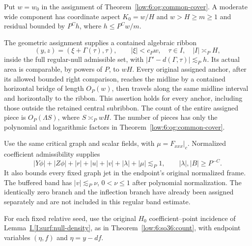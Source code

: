 \documentclass[11pt]{amsart}
\theoremstyle{definition}
\theoremstyle{remark}
\numberwithin{equation}{section}
\newcommand{\partIref}[1]{\hyperref[I:#1]{I.\ref*{I:#1}}}
\begin{document}
Put $w=w_0$ in the assignment of Theorem~\ref{low:6:og:common-cover}. A moderate wide component has coordinate aspect $K_0=w/H$ and $w>H\ge m\ge1$ and residual bounded by $P^Ch$, where $h\le P^Cw/m$. 

The geometric assignment supplies a contained algebraic ribbon
\begin{equation}\label{low:6:wc36:eq-ribbon}
 (y,z)=(\xi+\Gamma(\tau),\tau),\qquad |\xi|<c_Pw,\quad \tau\in I,\quad |I|\asymp_PH,
\end{equation}
inside the full regular-null admissible set, with $|\Gamma'-d(\Gamma,\tau)|\lesssim_P h$. Its actual area is comparable, by powers of $P$, to $wH$. Every original assigned anchor, after its allowed bounded right comparison, reaches the midline by a contained horizontal bridge of length $O_P(w)$, then travels along the same midline interval and horizontally to the ribbon. This assertion holds for every anchor, including those outside the retained central subribbon. The count of the entire assigned piece is $O_P(\Lambda S)$, where $S\asymp_PwH$. The number of pieces has only the polynomial and logarithmic factors in Theorem~\ref{low:6:og:common-cover}.

Use the same critical graph and scalar fields, with $\mu=F_{xxx}|_c$.
Normalized coefficient admissibility supplies
\begin{equation}\label{low:6:wc36:eq-activity}
 |Y\phi|+|Z\phi|+|r|+|u|+|v|+|\lambda|+|\mu|\lesssim_P1,
 \qquad |\lambda|,|B|\ge P^{-C}.
\end{equation}
It also bounds every fixed graph jet in the endpoint's original normalized frame. The buffered band has $|v|\lesssim_P\nu$, $0<\nu\le1$ after polynomial normalization. The identically zero branch and the inflection branch have already been assigned separately and are not included in this regular band estimate.

For each fixed relative seed, use the original $H_0$ coefficient--point incidence of Lemma~\partIref{surf:null-density}, as in Theorem~\ref{low:6:so36:count}, with endpoint variables $(\eta,f)$ and $\eta=y-df$. 
\end{document}
